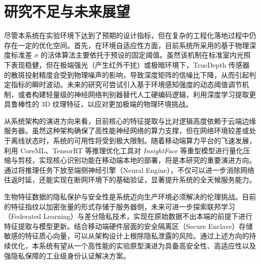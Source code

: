 \section{研究不足与未来展望}

尽管本系统在实验环境下达到了预期的设计指标，但在复杂的工程化落地过程中仍存在一定的优化空间。首先，在环境自适应性方面，目前系统所采用的基于物理深度标准差 $\sigma$ 的活体算法主要依托于预设的固定阈值。虽然该机制在标准室内光照下表现稳健，但在极端强光（产生红外干扰）或极暗环境下，TrueDepth 传感器的散斑投射精度会受到物理噪声的影响，导致深度矩阵的信噪比下降，从而引起判定指标的瞬时波动。未来的研究可尝试引入基于环境感知强度的动态阈值调节机制，或者构建轻量级的神经网络判别器替代人工硬编码逻辑，利用深度学习提取更具鲁棒性的 3D 纹理特征，以应对更加极端的物理环境挑战。



从系统架构的演进方向来看，目前核心的特征提取与比对逻辑高度依赖于云端边缘服务器。虽然这种架构确保了高性能神经网络的算力支撑，但在网络环境较差或处于离线状态时，系统的可用性将受到极大限制。随着移动端算力平台的飞速发展，利用 CoreML、TensorRT 等推理优化工具对 \textit{InsightFace} 等重型模型进行量化压缩与剪枝，实现核心识别功能在移动端本地的部署，将是本研究的重要演进方向。通过将推理任务下放至端侧神经引擎（Neural Engine），不仅可以进一步消除网络往返时延，还能实现在断网环境下的基础验证，显著提升系统的全天候服务能力。

生物特征数据的隐私保护与安全性是系统迈向生产环境必须解决的伦理挑战。目前的特征指纹以加密张量的形式存储于服务器侧，未来可进一步探索联邦学习（Federated Learning）与差分隐私技术，实现在原始数据不出本端的前提下进行特征提取与模型更新。结合移动端硬件层面的安全隔离区（Secure Enclave）存储敏感的特征质心向量，可以从架构设计上根除隐私泄露的风险。通过上述方向的持续优化，本系统有望从一个高性能的实验原型演进为具备高安全性、高适应性以及强隐私保障的工业级身份认证解决方案。

